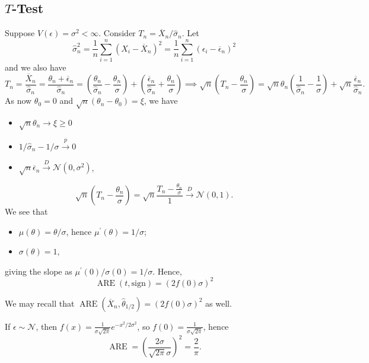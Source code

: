 \subsection{\(T\)-Test}
Suppose \(V(\epsilon ) = \sigma ^2 < \infty \). Consider \(T_n = \overline{X} _n / \hat{\sigma} _n\). Let
\[
	\hat{\sigma} _n^2
	= \frac{1}{n} \sum_{i=1}^{n} (X_i - \overline{X} _n)^2
	= \frac{1}{n} \sum_{i=1}^{n} (\epsilon _i - \overline{\epsilon} _n)^2
\]
and we also have
\[
	T_n
	= \frac{\overline{X} _n}{\hat{\sigma} _n}
	= \frac{\theta _n + \overline{\epsilon} _n}{\hat{\sigma} _n}
	= \left( \frac{\theta _n}{\hat{\sigma} _n} - \frac{\theta _n}{\sigma } \right) + \left( \frac{\overline{\epsilon} _n}{\hat{\sigma} _n} + \frac{\theta _n}{\sigma } \right)
	\implies
	\sqrt{n} \left( T_n - \frac{\theta _n}{\sigma } \right)
	= \sqrt{n} \theta _n \left( \frac{1}{\hat{\sigma} _n} - \frac{1}{\sigma } \right) + \sqrt{n} \frac{\overline{\epsilon} _n}{\hat{\sigma} _n}.
\]
As now \(\theta _0 = 0\) and \(\sqrt{n} (\theta _n - \theta _0) = \xi \), we have
\begin{itemize}
	\item \(\sqrt{n} \theta _n \to \xi \geq 0\)
	\item \(1 / \hat{\sigma} _n - 1 / \sigma \overset{p}{\to} 0\)
	\item \(\sqrt{n} \overline{\epsilon} _n \overset{D}{\to} \mathcal{N} (0, \sigma ^2)\),
\end{itemize}
\[
	\sqrt{n} \left( T_n - \frac{\theta _n}{\sigma } \right)
	= \sqrt{n} \frac{T_n - \frac{\theta _n}{\sigma }}{1}
	\overset{D}{\to} \mathcal{N} (0, 1).
\]
We see that
\begin{itemize}
	\item \(\mu (\theta ) = \theta / \sigma \), hence \(\mu ^{\prime} (\theta ) = 1 / \sigma \);
	\item \(\sigma (\theta ) = 1\),
\end{itemize}
giving the slope as \(\mu ^{\prime} (0) / \sigma (0) = 1 / \sigma \). Hence,
\[
	\operatorname{ARE}(t, \mathrm{sign} )
	= \left( 2 f(0) \sigma \right) ^2
\]

\begin{note}
	We may recall that \(\operatorname{ARE}(\overline{X} _n , \hat{\theta} _{1 / 2}) = (2 f(0) \sigma )^2\) as well.
\end{note}

\begin{eg}[Gaussian]
	If \(\epsilon \sim \mathcal{N} \), then \(f(x) = \frac{1}{\sigma \sqrt{2\pi } } e^{- x^2 / 2\sigma ^2}\), so \(f(0) = \frac{1}{\sigma \sqrt{2\pi } }\), hence
	\[
		\operatorname{ARE} = \left( \frac{2\sigma }{\sqrt{2\pi } \sigma } \right) ^2
		= \frac{2}{\pi }.
	\]
\end{eg}

